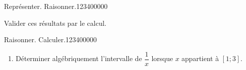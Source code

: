 \begin{pageAD}
\begin{ExoCad}{Représenter. Raisonner.}{1234}{0}{0}{0}{0}{0}
\begin{enumerate}[leftmargin=*]
\end{enumerate}
Valider ces résultats par le calcul.

\vspace{0.4cm}

\begin{minipage}{0.48\linewidth}
\end{minipage}
\hfill
\begin{minipage}{0.48\linewidth}
\end{minipage}

\end{ExoCad}


\begin{ExoCad}{Raisonner. Calculer.}{1234}{0}{0}{0}{0}{0}
\begin{enumerate}[leftmargin=*]
\item Déterminer algébriquement l'intervalle de $\dfrac{1}{x}$ lorsque $x$ appartient à $[1;3]$. 




\end{enumerate}
\end{ExoCad}
\end{pageAD}

